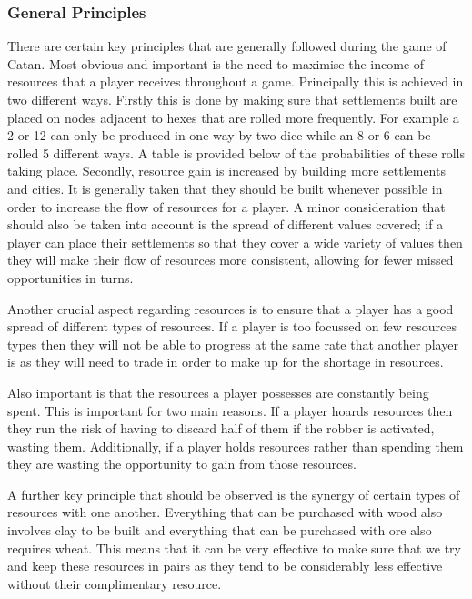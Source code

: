 \documentclass[]{article}
\begin{document}
\subsubsection{General Principles}
There are certain key principles that are generally followed during the game of Catan. Most obvious and important is the need to maximise the income of resources that a player receives throughout a game. Principally this is achieved in two different ways. Firstly this is done by making sure that settlements built are placed on nodes adjacent to hexes that are rolled more frequently. For example a 2 or 12 can only be produced in one way by two dice while an 8 or 6 can be rolled 5 different ways. A table is provided below of the probabilities of these rolls taking place. Secondly, resource gain is increased by building more settlements and cities. It is generally taken that they should be built whenever possible in order to increase the flow of resources for a player. A minor consideration that should also be taken into account is the spread of different values covered; if a player can place their settlements so that they cover a wide variety of values then they will make their flow of resources more consistent, allowing for fewer missed opportunities in turns.

\par Another crucial aspect regarding resources is to ensure that a player has a good spread of different types of resources. If a player is too focussed on few resources types then they will not be able to progress at the same rate that another player is as they will need to trade in order to make up for the shortage in resources.

\par Also important is that the resources a player possesses are constantly being spent. This is important for two main reasons. If a player hoards resources then they run the risk of having to discard half of them if the robber is activated, wasting them. Additionally, if a player holds resources rather than spending them they are wasting the opportunity to gain from those resources. 

\par A further key principle that should be observed is the synergy of certain types of resources with one another. Everything that can be purchased with wood also involves clay to be built and everything that can be purchased with ore also requires wheat. This means that it can be very effective to make sure that we try and keep these resources in pairs as they tend to be considerably less effective without their complimentary resource.
\end{document}

